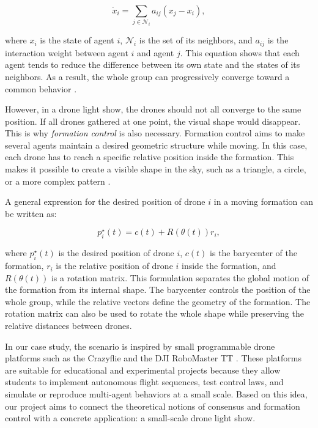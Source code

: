 \begin{equation}
    \dot{x}_i = \sum_{j \in \mathcal{N}_i} a_{ij}(x_j - x_i),
\end{equation}

where $x_i$ is the state of agent $i$, $\mathcal{N}_i$ is the set of its neighbors, and $a_{ij}$ is the interaction weight between agent $i$ and agent $j$. This equation shows that each agent tends to reduce the difference between its own state and the states of its neighbors. As a result, the whole group can progressively converge toward a common behavior \cite{olfati2007consensus}.

However, in a drone light show, the drones should not all converge to the same position. If all drones gathered at one point, the visual shape would disappear. This is why \textit{formation control} is also necessary. Formation control aims to make several agents maintain a desired geometric structure while moving. In this case, each drone has to reach a specific relative position inside the formation. This makes it possible to create a visible shape in the sky, such as a triangle, a circle, or a more complex pattern \cite{oh2015formation}.

A general expression for the desired position of drone $i$ in a moving formation can be written as:

\begin{equation}
    p_i^{\star}(t) = c(t) + R(\theta(t))r_i,
\end{equation}

where $p_i^{\star}(t)$ is the desired position of drone $i$, $c(t)$ is the barycenter of the formation, $r_i$ is the relative position of drone $i$ inside the formation, and $R(\theta(t))$ is a rotation matrix. This formulation separates the global motion of the formation from its internal shape. The barycenter controls the position of the whole group, while the relative vectors define the geometry of the formation. The rotation matrix can also be used to rotate the whole shape while preserving the relative distances between drones.

In our case study, the scenario is inspired by small programmable drone platforms such as the Crazyflie and the DJI RoboMaster TT \cite{bitcrazeCrazyflie,djiRoboMasterTT}. These platforms are suitable for educational and experimental projects because they allow students to implement autonomous flight sequences, test control laws, and simulate or reproduce multi-agent behaviors at a small scale. Based on this idea, our project aims to connect the theoretical notions of consensus and formation control with a concrete application: a small-scale drone light show.


